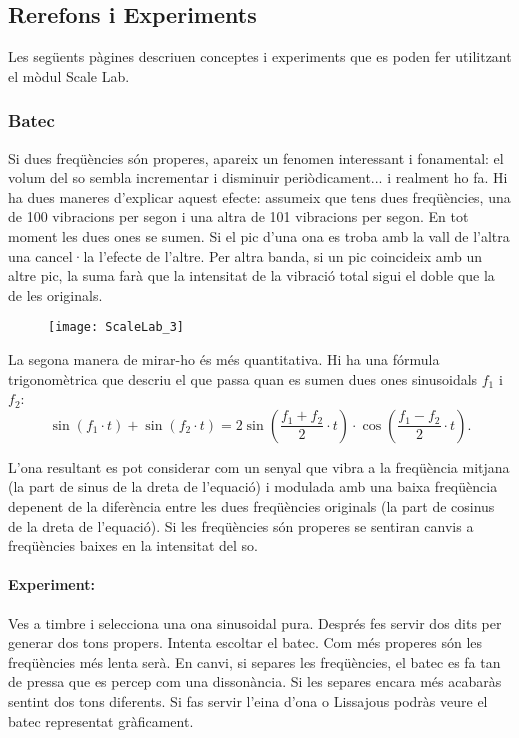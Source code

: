 \subsection{Rerefons i Experiments}
Les següents pàgines descriuen conceptes i experiments que es poden fer utilitzant el mòdul Scale Lab.

\subsubsection{Batec}
Si dues freqüències són properes, apareix un fenomen interessant i fonamental: el volum del so sembla incrementar i disminuir periòdicament... i realment ho fa. Hi ha dues maneres d'explicar aquest efecte: assumeix que tens dues freqüències, una de 100 vibracions per segon i una altra de 101 vibracions per segon. En tot moment les dues ones se sumen. Si el pic d'una ona es troba amb la vall de l'altra una cancel·la l'efecte de l'altre. Per altra banda, si un pic coincideix amb un altre pic, la suma farà que la intensitat de la vibració total sigui el doble que la de les originals. 

\begin{figure}[h]
\centering
\texttt{[image: ScaleLab\_3]}
\end{figure}

La segona manera de mirar-ho és més quantitativa. Hi ha una fórmula trigonomètrica que descriu el que passa quan es sumen dues ones sinusoidals $f_1$ i $f_2$:
$$\sin(f_1 \cdot t) + \sin(f_2\cdot t) = 2 \sin\left( \frac{f_1+f_2}{2}\cdot t\right) \cdot \cos\left( \frac{f_1-f_2}{2}\cdot t\right) .$$

L'ona resultant es pot considerar com un senyal que vibra a la freqüència mitjana (la part de sinus de la dreta de l'equació) i modulada amb una baixa freqüència depenent de la diferència entre les dues freqüències originals (la part de cosinus de la dreta de l'equació). Si les freqüències són properes se sentiran canvis a freqüències baixes en la intensitat del so.

\paragraph{Experiment:} Ves a timbre i selecciona una ona sinusoidal pura. Després fes servir dos dits per generar dos tons propers. Intenta escoltar el batec. Com més properes són les freqüències més lenta serà. En canvi, si separes les freqüències, el batec es fa tan de pressa que es percep com una dissonància. Si les separes encara més acabaràs sentint dos tons diferents. Si fas servir l'eina d'ona o Lissajous podràs veure el batec representat gràficament. 

